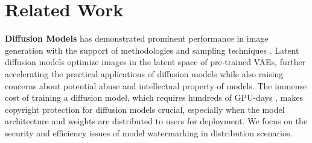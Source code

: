 \section{Related Work}


\textbf{Diffusion Models} has demonstrated prominent performance in image generation \cite{dhariwal2021diffusion} with the support of methodologies \cite{song2020score} and sampling techniques \cite{song2020denoising}.
Latent diffusion models optimize images in the latent space of pre-trained VAEs, further accelerating the practical applications of diffusion models while also raising concerns about potential abuse and intellectual property of models. 
The immense cost of training a diffusion model, which requires hundreds of GPU-days \cite{rombach2022high}, makes copyright protection for diffusion models crucial, especially when the model architecture and weights are distributed to users for deployment. We focus on the security and efficiency issues of model watermarking in distribution scenarios.

